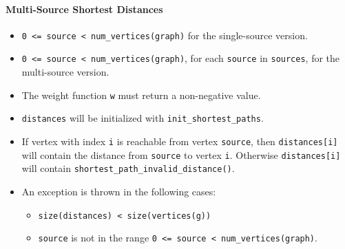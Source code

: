 \paragraph{Multi-Source Shortest Distances}
{\small
      
}

\begin{itemdescr}
      \pnum\mandates
            \begin{itemize}
                  \item
                        \lstinline{0 <= source < num_vertices(graph)} for the single-source version. 
                  \item
                        \lstinline{0 <= source < num_vertices(graph)}, for each \lstinline{source} in \lstinline{sources}, 
                                   for the multi-source version.
                  \item
                        The weight function \lstinline{w} must return a non-negative value.
            \end{itemize}
      \pnum\preconditions
            \begin{itemize}
                  \item
                        \lstinline{distances} will be initialized with \lstinline{init_shortest_paths}.
            \end{itemize}
      \pnum\effects
            \begin{itemize}
                  \item
                        If vertex with index \lstinline{i} is reachable from vertex \lstinline{source}, then
                        \lstinline{distances[i]} will contain the distance from \lstinline{source} to vertex
                        \lstinline{i}.  Otherwise \lstinline{distances[i]} will contain
                        \lstinline{shortest_path_invalid_distance()}.
            \end{itemize}
      \pnum\throws 
            \begin{itemize}
                  \item An  exception is thrown in the following cases:
                        \begin{itemize}
                              \item \lstinline{size(distances) < size(vertices(g))}
                              \item \lstinline{source} is not in the range \lstinline{0 <= source < num_vertices(graph)}.

\end{itemize}
\end{itemize}
\end{itemdescr}
